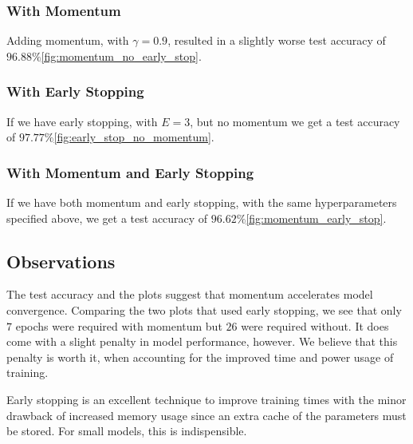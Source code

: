 \subsubsection{With Momentum}

Adding momentum, with $\gamma = 0.9$, resulted in a slightly worse test accuracy of $96.88\%$\cref{fig:momentum_no_early_stop}.

\subsubsection{With Early Stopping}

If we have early stopping, with $E=3$, but no momentum we get a test accuracy of $97.77\%$\cref{fig:early_stop_no_momentum}.

\subsubsection{With Momentum and Early Stopping}

If we have both momentum and early stopping, with the same hyperparameters specified above,
we get a test accuracy of $96.62\%$\cref{fig:momentum_early_stop}.


\subsection{Observations}

The test accuracy and the plots suggest that momentum accelerates model convergence.
Comparing the two plots that used early stopping, we see that only $7$ epochs were required
with momentum but $26$ were required without. It does come with a slight penalty in model performance,
however. We believe that this penalty is worth it, when accounting for the improved time and power
usage of training.

Early stopping is an excellent  technique to improve training times with the minor drawback of increased memory usage
since an extra cache of the parameters must be stored. For small models, this is indispensible.
